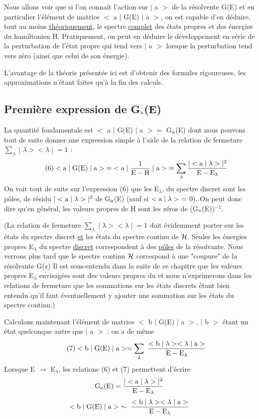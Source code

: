 Nous allons voir que si l'on connaît l'action sur $|$ a $>$ de la résolvente G(E) et en
particulier l'élément de matrice $<$ a $|$ G(E) $|$ a $>$, on est capable
d'en déduire, tout au moins \ul{théoriquement}, le spectre \ul{complet} des états propres
et des énergies du hamiltonien H. Pratiquement, on peut en déduire le développement
en série de la perturbation de l'état propre qui tend vers $|$ a $>$ lorsque
la perturbation tend vers zéro (ainsi que celui de son énergie).

L'avantage de la théorie présentée ici est d'obtenir des formules
rigoureuses, les approximations n'étant faites qu'à la fin des calculs.
\subsection{Première expression de G$_{\text{a}}$(E)}%
La quantité fondamentale est $<$ a $|$ G(E) $|$ a $>=$ G$_{\text{a}}$(E) dont nous pouvons
tout de suite donner une expression simple à l'aide de la relation de fermeture
$\sum_\lambda\;|\;\lambda><\lambda\;|\;=1$ :
\[
\tag{6}<\text{a}\;|\;\text{G(E)}\;|\;\text{a}>\;=\;<\text{a}\;|\;\frac{1}{\text{E}-\text{H}}\;|\;\text{a}>\;=
\sum_\lambda\frac{|<\text{a}\;|\;\lambda>|^2}{\text{E}-\text{E}_\lambda}
\]
On voit tout de suite sur l'expression (6) que les E$_\lambda$, du spectre discret sont les
pôles, de résidu $|<\text{a}\;|\;\lambda>|^2$ de G$_{\text{a}}$(E) (sauf si $<\text{a}\;|\;\lambda>\;=$ 0). On peut donc dire
qu'en général, les valeurs propres de H sont les zéros de (G$_{\text{a}}$(E))$^{-1}$.

{\footnotesize (La relation de fermeture $\sum_\lambda\;|\;\lambda><\lambda\;|\;=1$
doit évidemment porter sur les états du
spectre discret \ul{et} les états du spectre continu de $\mathcal{H}$. Seules les énergies propres
E$_\lambda$ du spectre \ul{discret} correspondent à des \ul{pôles} de la résolvante. Nous verrons plus
tard que le spectre continu $\mathcal{H}$ correspond à une "coupure" de la résolvante G(z)
Il est sous-entendu dans la suite de ce chapitre que les valeurs propres E$_\lambda$ envisagées sont des valeurs
propres du  et nous n'exprimerons dans les relations de fermeture que les sommations sur les 
états discrets étant bien entendu
qu'il faut éventuellement y ajouter une sommation sur les états du spectre continu.)}

Calculons maintenant l'élément de matrice $<$ b $|$ G(E) $|$ a $>$, $|$ b $>$
étant un état quelconque autre que $|$ a $>$ : on a de même
\[
\tag{7}<\mt{b}\;|\;\mt{G(E)}\;|\;\mt{a}>=\sum_\lambda\ \frac{<\mt{b}\;|\;\lambda>
<\lambda\;|\;\mt{a}>}{\mt{E}-\mt{E}_\lambda}
\]
Lorsque E $\to$ E$_\lambda$, les relations (6) et (7) permettent d'écrire
\[
\text{G}_{\text{a}}(\text{E})=\frac{|<\text{a}\;|\;\lambda>|^2}{\text{E}-\text{E}_\lambda}
\]
\[
<\mt{b}\;|\;\mt{G(E)}\;|\;\mt{a}>\ \sim\ \frac{<\mt{b}\;|\;\lambda><\lambda\;|\;\mt{a}>}{\mt{E}-\mt{E}_\lambda}
\]

